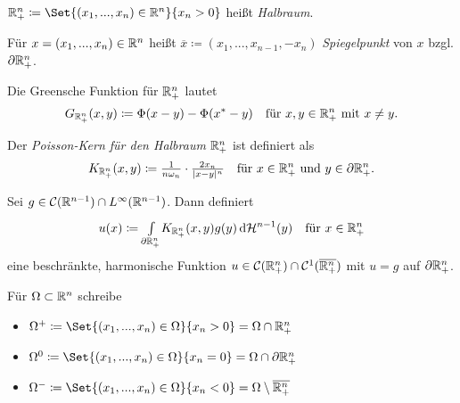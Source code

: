 \documentclass{cheat-sheet}
\newcommand{\HM}{\mathcal{H}} %
\begin{document}

\begin{nota}
  $\R^n_+ \coloneqq \Set{ (x_1, ..., x_n) \in \R^n }{ x_n > 0 }$ heißt \emph{Halbraum}.
\end{nota}

\begin{defn}
  Für $x = (x_1, ..., x_n) \in \mathbb{R}^n$ heißt $\overline{x} \coloneqq (x_1, ..., x_{n-1}, - x_n)$ \emph{Spiegelpunkt} von $x$ bzgl. $\partial \mathbb{R}^n_+$.
\end{defn}

\begin{satz}
  Die Greensche Funktion für $\mathbb{R}^n_+$ lautet
  \[
    G_{\mathbb{R}^n_+}(x, y) \coloneqq \Phi(x - y) - \Phi(x^* - y) \quad
    \text{für $x, y \in \mathbb{R}^n_+$ mit $x \not= y$.}
  \]
\end{satz}

\begin{defn}
  Der \emph{Poisson-Kern für den Halbraum} $\mathbb{R}^n_+$ ist definiert als
  \[
    K_{\mathbb{R}^n_+}(x, y) \coloneqq \tfrac{1}{n \omega_n} \cdot \tfrac{2 x_n}{\lvert x-y\rvert^n} \quad
    \text{für $x \in \mathbb{R}^n_+$ und $y \in \partial \mathbb{R}^n_+$.}
  \]
\end{defn}

\begin{satz}
  Sei $g \in \mathcal{C}(\mathbb{R}^{n-1}) \cap L^\infty(\mathbb{R}^{n-1})$. Dann definiert
  \[
    u(x) \coloneqq \Int{\partial \R^n_+}{}{K_{\R^n_+}(x, y) g(y)}{\HM^{n-1}(y)} \quad
    \text{für $x \in \R^n_+$}
  \]
  eine beschränkte, harmonische Funktion $u \in \mathcal{C}(\mathbb{R}^n_+) \cap \mathcal{C}^1(\overline{\mathbb{R}^n_+})$ mit $u = g$ auf $\partial \mathbb{R}^n_+$.
\end{satz}

\begin{nota}
  Für $\Omega \subset \mathbb{R}^n$ schreibe
  \begin{itemize}
    \item $\Omega^+ \coloneqq \Set{(x_1, ..., x_n) \in \Omega}{x_n > 0} = \Omega \cap \R^n_+$
    \item $\Omega^0 \coloneqq \Set{(x_1, ..., x_n) \in \Omega}{x_n = 0} = \Omega \cap \partial \R^n_+$
    \item $\Omega^- \coloneqq \Set{(x_1, ..., x_n) \in \Omega}{x_n < 0} = \Omega \setminus \overline{\R^n_+}$
  \end{itemize}
\end{nota}
\end{document}
